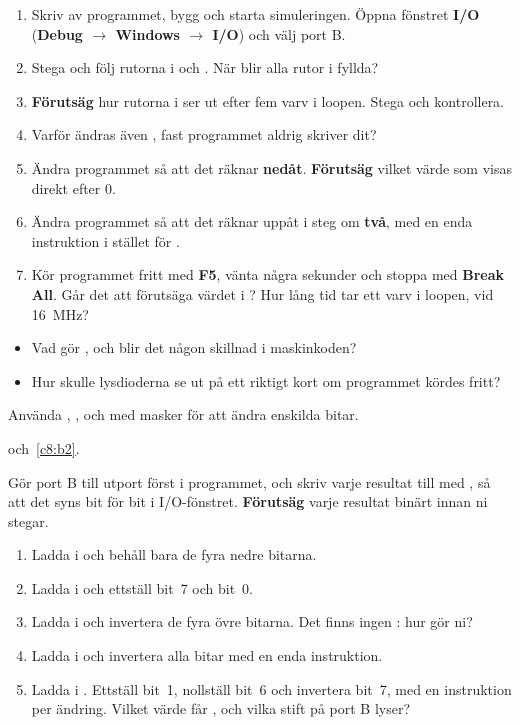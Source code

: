 \begin{enumerate}
  \item Skriv av programmet, bygg och starta simuleringen. Öppna fönstret \textbf{I/O}
    (\textbf{Debug $\rightarrow$ Windows $\rightarrow$ I/O}) och välj port B.
  \item Stega och följ rutorna i  och . När blir alla rutor i 
    fyllda?
  \item \textbf{Förutsäg} hur rutorna i  ser ut efter fem varv i loopen. Stega och
    kontrollera.
  \item Varför ändras även , fast programmet aldrig skriver dit?
  \item Ändra programmet så att det räknar \textbf{nedåt}. \textbf{Förutsäg} vilket värde som
    visas direkt efter 0.
  \item Ändra programmet så att det räknar uppåt i steg om \textbf{två}, med en enda instruktion i
    stället för .
  \item Kör programmet fritt med \textbf{F5}, vänta några sekunder och stoppa med \textbf{Break
    All}. Går det att förutsäga värdet i ? Hur lång tid tar ett varv i loopen, vid
    16~MHz?
\end{enumerate}

\begin{itemize}
  \item Vad gör , och blir det någon skillnad i maskinkoden?
  \item Hur skulle lysdioderna se ut på ett riktigt kort om programmet kördes fritt?
\end{itemize}


\label{lab3:d7}
Använda , ,  och  med masker för att ändra enskilda
bitar.

 och~\ref{c8:b2}.

Gör port B till utport först i programmet, och skriv varje resultat till  med
, så att det syns bit för bit i I/O-fönstret. \textbf{Förutsäg} varje resultat binärt
innan ni stegar.
\begin{enumerate}
  \item Ladda  i  och behåll bara de fyra nedre bitarna.
  \item Ladda  i  och ettställ bit~7 och bit~0.
  \item Ladda  i  och invertera de fyra övre bitarna. Det finns ingen
    : hur gör ni?
  \item Ladda  i  och invertera alla bitar med en enda instruktion.
  \item Ladda  i . Ettställ bit~1, nollställ bit~6 och invertera bit~7,
    med en instruktion per ändring. Vilket värde får , och vilka stift på port B lyser?
\end{enumerate}

